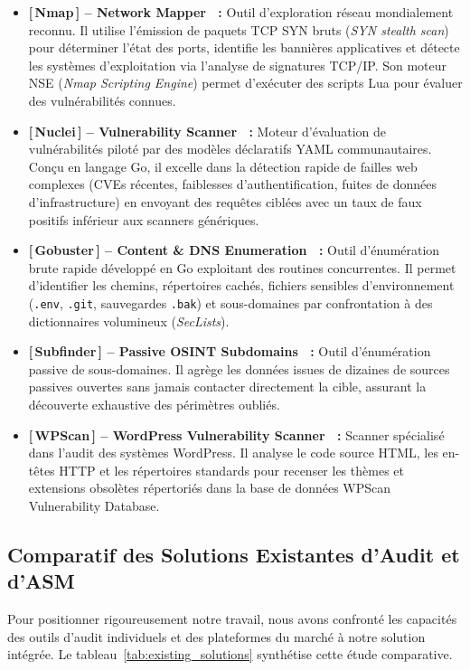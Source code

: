 \begin{itemize}
    \item \textbf{\color{blue!80!black}[\,Nmap\,] -- Network Mapper~\cite{nmap} :} Outil d'exploration r\'eseau mondialement reconnu. Il utilise l'\'emission de paquets TCP SYN bruts (\textit{SYN stealth scan}) pour d\'eterminer l'\'etat des ports, identifie les banni\`eres applicatives et d\'etecte les syst\`emes d'exploitation via l'analyse de signatures TCP/IP. Son moteur NSE (\textit{Nmap Scripting Engine}) permet d'ex\'ecuter des scripts Lua pour \'evaluer des vuln\'erabilit\'es connues.
    \item \textbf{\color{purple!80!black}[\,Nuclei\,] -- Vulnerability Scanner~\cite{nuclei} :} Moteur d'\'evaluation de vuln\'erabilit\'es pilot\'e par des mod\`eles d\'eclaratifs YAML communautaires. Con\c{c}u en langage Go, il excelle dans la d\'etection rapide de failles web complexes (CVEs r\'ecentes, faiblesses d'authentification, fuites de donn\'ees d'infrastructure) en envoyant des requ\^etes cibl\'ees avec un taux de faux positifs inf\'erieur aux scanners g\'en\'eriques.
    \item \textbf{\color{cyan!80!black}[\,Gobuster\,] -- Content \& DNS Enumeration~\cite{gobuster} :} Outil d'\'enum\'eration brute rapide d\'evelopp\'e en Go exploitant des routines concurrentes. Il permet d'identifier les chemins, r\'epertoires cach\'es, fichiers sensibles d'environnement (\texttt{.env}, \texttt{.git}, sauvegardes \texttt{.bak}) et sous-domaines par confrontation \`a des dictionnaires volumineux (\textit{SecLists}).
    \item \textbf{\color{green!60!black}[\,Subfinder\,] -- Passive OSINT Subdomains~\cite{subfinder} :} Outil d'\'enum\'eration passive de sous-domaines. Il agr\`ege les donn\'ees issues de dizaines de sources passives ouvertes sans jamais contacter directement la cible, assurant la d\'ecouverte exhaustive des p\'erim\`etres oubli\'es.
    \item \textbf{\color{orange!80!black}[\,WPScan\,] -- WordPress Vulnerability Scanner~\cite{wpscan} :} Scanner sp\'ecialis\'e dans l'audit des syst\`emes WordPress. Il analyse le code source HTML, les en-t\^etes HTTP et les r\'epertoires standards pour recenser les th\`emes et extensions obsol\`etes r\'epertori\'es dans la base de donn\'ees WPScan Vulnerability Database.
\end{itemize}

\subsection{Comparatif des Solutions Existantes d'Audit et d'ASM}
\par Pour positionner rigoureusement notre travail, nous avons confront\'e les capacit\'es des outils d'audit individuels et des plateformes du march\'e \`a notre solution int\'egr\'ee. Le tableau~\ref{tab:existing_solutions} synth\'etise cette \'etude comparative.

